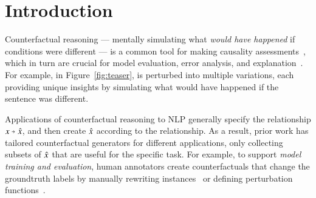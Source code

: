 \section{Introduction}
\label{sec:intro}



Counterfactual reasoning --- mentally simulating what \emph{would have happened} if conditions were different --- is a common tool for making causality assessments~\cite{kahneman}, which in turn are crucial for model evaluation, error analysis, and explanation~\cite{miller}. 
For example, in Figure~\ref{fig:teaser},  is perturbed into multiple variations, each providing unique insights by simulating what would have happened if the sentence was different.

Applications of counterfactual reasoning to NLP generally specify the relationship $x \veryshortarrow \xp$, and then create $\hat{x}$ according to the relationship.
As a result, prior work has tailored counterfactual generators for different applications, only collecting subsets of $\hat{x}$ that are useful for the specific task.
For example, to support {\em model training and evaluation}, human annotators create counterfactuals that change the groundtruth labels by manually rewriting instances~\cite{gardner2020contrast, qin-etal-2019-counterfactual} or defining perturbation functions~\cite{checklist:acl20}.
